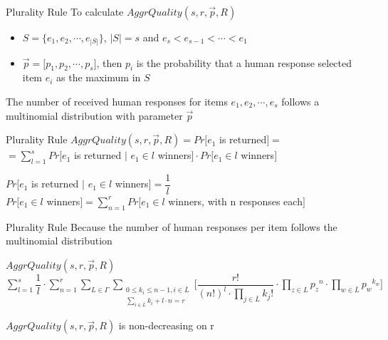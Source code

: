 \documentclass{beamer}
\begin{document}
\begin{frame}{Plurality Rule}
To calculate $AggrQuality(s, r, \vec{p}, R)$
\begin{itemize}
	\item $S = \{ e_1, e_2, \cdots, e_{\left\vert{S}\right\vert} \}$, $\left\vert{S}\right\vert = s$ and $e_s < e_{s-1} < \cdots < e_1$
	\item $\vec{p} = \big[ p_1, p_2, \cdots, p_s \big]$, then $p_i$ is the probability that a human response selected item $e_i$ as the maximum in $S$
\end{itemize} 
\vspace{5pt}
The number of received human responses for items $e_1, e_2, \cdots, e_s$ follows a multinomial distribution with parameter $\vec{p}$

\end{frame}

\begin{frame}{Plurality Rule}
	$AggrQuality(s, r, \vec{p}, R) = Pr\big[e_1$ is returned$\big] =$\\$= \sum\limits_{l=1}^s Pr\big[e_1$ is returned $\vert$ $e_1 \in l$ winners$\big] \cdot Pr\big[e_1 \in l$ winners$\big]$\vspace{5pt}
	\pause
	\begin{block}{}
$Pr\big[e_1$ is returned $\vert$ $e_1 \in l$ winners$\big] = \dfrac{1}{l}$\\
$Pr\big[e_1 \in l$ winners$\big] = \sum\limits_{n=1}^r Pr\big[e_1 \in l$ winners, with n responses each$\big]$
\end{block}
\end{frame}

\begin{frame}{Plurality Rule}
	Because the number of human responses per item follows the multinomial distribution
	\pause
	\vspace{5pt}
	\begin{block}{$AggrQuality(s, r, \vec{p}, R)$}
	 $\sum\limits_{l=1}^s \dfrac{1}{l}\cdot\sum\limits_{n=1}^r \sum\limits_{L\in\Gamma}  \sum\limits_{\substack{0 \leq k_i \leq n-1, i \in \bar{L} \\ \sum_{i \in \bar{L}} k_i + l \cdot n = r}} \Bigg[ \dfrac{r!}{{(n!)}^l \cdot \prod_{j \in \bar{L}}k_j!} \cdot \prod\limits_{z \in L} {p_{z}}^n \cdot \prod\limits_{w \in \bar{L}} {p_w}^{k_w}\Bigg]$
	 \end{block}
	 \pause
	 \vspace{5pt}
	 $AggrQuality(s, r, \vec{p}, R)$ is non-decreasing on r
\end{frame}
\end{document}
